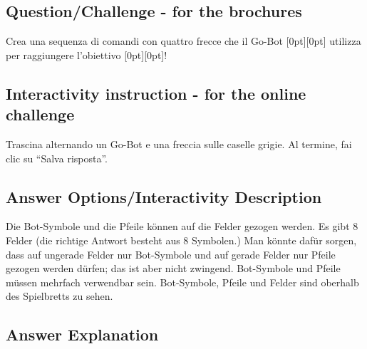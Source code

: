 \documentclass[a4paper,11pt]{report}
\newcommand{\taskGraphicsFolder}{..}
\begin{document}
{\em


\subsection*{Question/Challenge - for the brochures}

Crea una sequenza di comandi con quattro frecce che il Go-Bot \raisebox{-0.5ex}[0pt][0pt]{} utilizza per raggiungere l’obiettivo \raisebox{-0.5ex}[0pt][0pt]{}!

{\centering%
{\centering%
\par}

{\centering%
\par}\par}

}


\subsection*{Interactivity instruction - for the online challenge}

Trascina alternando un Go-Bot e una freccia sulle caselle grigie. Al termine, fai clic su \enquote{Salva risposta}.

\begingroup
\renewcommand{\arraystretch}{1.5}
\subsection*{Answer Options/Interactivity Description}

Die Bot-Symbole und die Pfeile können auf die Felder gezogen werden.  Es gibt $8$ Felder (die richtige Antwort besteht aus $8$ Symbolen.)  Man könnte dafür sorgen, dass auf ungerade Felder nur Bot-Symbole und auf gerade Felder nur Pfeile gezogen werden dürfen; das ist aber nicht zwingend.  Bot-Symbole und Pfeile müssen mehrfach verwendbar sein.  Bot-Symbole, Pfeile und Felder sind oberhalb des Spielbretts zu sehen.

\endgroup

\subsection*{Answer Explanation}
\end{document}
